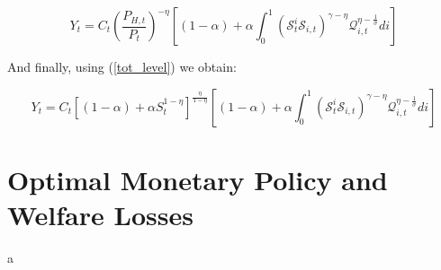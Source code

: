 \documentclass{article}
\begin{document}
\begin{equation}
    Y_{t} = C_t \left( \frac{P_{H,t}}{P_t} \right)^{-\eta} \left[(1-\alpha)  +  \alpha \int_0^1 \left(\mathcal S^i_t \mathcal S_{i,t} \right)^{\gamma - \eta} \mathcal Q^{\eta - \frac{1}{\sigma}}_{i,t} di \right] 
\end{equation}

And finally, using (\ref{tot_level}) we obtain:

\begin{equation}
    Y_{t} = C_t \left[(1-\alpha) + \alpha S_t^{1-\eta} \right]^{\frac{\eta}{1-\eta}} \left[(1-\alpha)  +  \alpha \int_0^1 \left(\mathcal S^i_t \mathcal S_{i,t} \right)^{\gamma - \eta} \mathcal Q^{\eta - \frac{1}{\sigma}}_{i,t} di \right] 
\end{equation}

\section{Optimal Monetary Policy and Welfare Losses}
a
\end{document}
